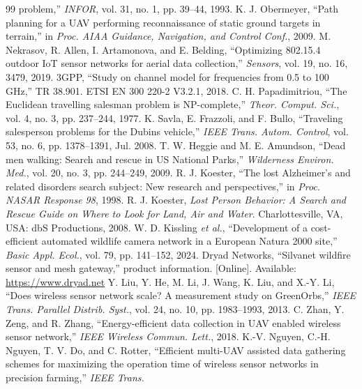 \begin{thebibliography}{99}
problem,'' \emph{INFOR}, vol. 31, no. 1, pp. 39--44, 1993.
 K. J. Obermeyer, ``Path planning for a UAV performing reconnaissance of static ground targets in
terrain,'' in \emph{Proc. AIAA Guidance, Navigation, and Control Conf.}, 2009.
 M. Nekrasov, R. Allen, I. Artamonova, and E. Belding, ``Optimizing 802.15.4 outdoor IoT sensor
networks for aerial data collection,'' \emph{Sensors}, vol. 19, no. 16, 3479, 2019.
 3GPP, ``Study on channel model for frequencies from 0.5 to 100 GHz,'' TR 38.901.
 ETSI EN 300 220-2 V3.2.1, 2018.
 C. H. Papadimitriou, ``The Euclidean travelling salesman problem is NP-complete,''
\emph{Theor. Comput. Sci.}, vol. 4, no. 3, pp. 237--244, 1977.
 K. Savla, E. Frazzoli, and F. Bullo, ``Traveling salesperson problems for the Dubins vehicle,''
\emph{IEEE Trans. Autom. Control}, vol. 53, no. 6, pp. 1378--1391, Jul. 2008.
 T. W. Heggie and M. E. Amundson, ``Dead men walking: Search and rescue in US National Parks,''
\emph{Wilderness Environ. Med.}, vol. 20, no. 3, pp. 244--249, 2009. 
 R. J. Koester, ``The lost Alzheimer's and related disorders search subject: New research and
perspectives,'' in \emph{Proc. NASAR Response 98}, 1998. 
 R. J. Koester, \emph{Lost Person Behavior: A Search and Rescue Guide on Where to Look for Land, Air
and Water}. Charlottesville, VA, USA: dbS Productions, 2008.
 W. D. Kissling \emph{et al.}, ``Development of a cost-efficient automated wildlife camera network
in a European Natura 2000 site,'' \emph{Basic Appl. Ecol.}, vol. 79, pp. 141--152, 2024.
 Dryad Networks, ``Silvanet wildfire sensor and mesh gateway,'' product information. [Online]. Available:
\url{https://www.dryad.net} 
 Y. Liu, Y. He, M. Li, J. Wang, K. Liu, and X.-Y. Li, ``Does wireless sensor network scale? A
measurement study on GreenOrbs,'' \emph{IEEE Trans. Parallel Distrib. Syst.}, vol. 24, no. 10, pp. 1983--1993, 2013.
 C. Zhan, Y. Zeng, and R. Zhang, ``Energy-efficient data collection in UAV enabled wireless sensor
network,'' \emph{IEEE Wireless Commun. Lett.}, 2018. 
 K.-V. Nguyen, C.-H. Nguyen, T. V. Do, and C. Rotter, ``Efficient multi-UAV assisted data
gathering schemes for maximizing the operation time of wireless sensor networks in precision farming,'' \emph{IEEE Trans.
}
\end{thebibliography}
